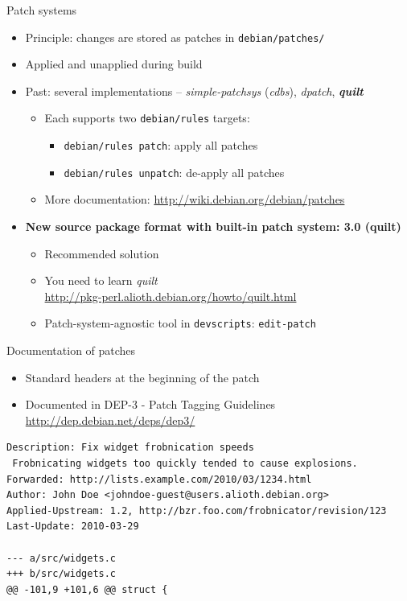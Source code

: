 \documentclass[10pt,final]{beamer}
\begin{document}
\begin{frame}{Patch systems}
  \begin{itemize}
  \item Principle: changes are stored as patches in \texttt{debian/patches/}
    \br
  \item Applied and unapplied during build
    \br
  \item Past: several implementations -- \textsl{simple-patchsys} (\textsl{cdbs}),
    \textsl{dpatch}, \textbf{\textsl{quilt}}
    \begin{itemize}
  \item Each supports two \texttt{debian/rules} targets:
    \begin{itemize}
    \item \texttt{debian/rules patch}: apply all patches
    \item \texttt{debian/rules unpatch}: de-apply all patches
    \end{itemize}
	  \hbr
  \item More documentation: \url{http://wiki.debian.org/debian/patches}
  \end{itemize}
  \br
  \item \textbf{New source package format with built-in patch system: 3.0 (quilt)}
  \begin{itemize}
  \item Recommended solution
	  \hbr
  \item You need to learn \textsl{quilt}\\
    \url{http://pkg-perl.alioth.debian.org/howto/quilt.html}
    \hbr
  \item Patch-system-agnostic tool in \texttt{devscripts}: \texttt{edit-patch}
  \end{itemize}
  \end{itemize}
\end{frame}

\begin{frame}[fragile=singleslide]{Documentation of patches}
  \begin{itemize}
	  \item Standard headers at the beginning of the patch
    \br
  \item Documented in DEP-3 - Patch Tagging Guidelines\\
    \url{http://dep.debian.net/deps/dep3/}
  \end{itemize}
  \vfill
\seprule
  \begin{lstlisting}[basicstyle=\ttfamily\footnotesize]
Description: Fix widget frobnication speeds
 Frobnicating widgets too quickly tended to cause explosions.
Forwarded: http://lists.example.com/2010/03/1234.html
Author: John Doe <johndoe-guest@users.alioth.debian.org>
Applied-Upstream: 1.2, http://bzr.foo.com/frobnicator/revision/123
Last-Update: 2010-03-29

--- a/src/widgets.c
+++ b/src/widgets.c
@@ -101,9 +101,6 @@ struct {
\end{lstlisting}
\end{frame}
\end{document}
